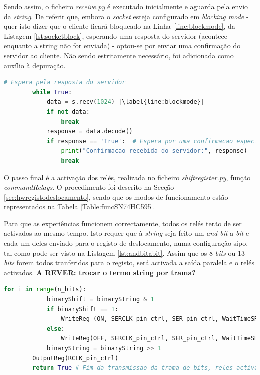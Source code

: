 Sendo assim, o ficheiro \textit{receive.py} é executado inicialmente e aguarda pela envio da \textit{string}. De referir que, embora o \textit{socket} esteja configurado em \textit{blocking mode} - quer isto dizer que o cliente ficará bloqueado na Linha~\ref{line:blockmode}, da Listagem \ref{lst:socketblock}, esperando uma resposta do servidor \cite{Sockets} (acontece enquanto a string não for enviada) - optou-se por enviar uma confirmação do servidor ao cliente. Não sendo estritamente necessário, foi adicionada como auxílio à depuração.

\begin{minipage}{0.9\linewidth}
	\begin{lstlisting}[language=Python,escapechar=|, caption=\textit{Block Mode \textins{Sockets} configRelays.py}, label=lst:socketblock]
		# Espera pela resposta do servidor
        while True:
            data = s.recv(1024) |\label{line:blockmode}|
            if not data:
                break
            response = data.decode()
            if response == 'True':  # Espera por uma confirmacao especifica do servidor
                print("Confirmacao recebida do servidor:", response)
                break
	\end{lstlisting}
\end{minipage}

O passo final é a activação dos relés, realizada no ficheiro \textit{shift\textunderscore register.py}, função \textit{commandRelays}. O procedimento foi descrito na Secção \ref{sec:hwregistodeslocamento}, sendo que os modos de funcionamento estão representados na Tabela \ref{Table:funcSN74HC595}.

Para que as experiências funcionem correctamente, todos os relés terão de ser activados ao mesmo tempo. Isto requer que à \textit{string} seja feito um \textit{and bit} a \textit{bit} e cada um deles enviado para o registo de deslocamento, numa configuração \acrshort{sipo}, tal como pode ser visto na Listagem \ref{lst:andbitabit}. Assim que os 8 \textit{bits} ou 13 \textit{bits} forem todos tranferidos para o registo, será activada a saída paralela e o relés activados. \textbf{A REVER: trocar o termo string por trama?} 

\begin{minipage}{0.9\linewidth}
	\begin{lstlisting}[language=Python,escapechar=|, caption=\textit{And bit} \textit{bit shift\textunderscore register - NOME DO FICH}, label=lst:andbitabit]
		for i in range(n_bits):
			binaryShift = binaryString & 1
			if binaryShift == 1:
				WriteReg (ON, SERCLK_pin_ctrl, SER_pin_ctrl, WaitTimeSR)
			else:
				WriteReg(OFF, SERCLK_pin_ctrl, SER_pin_ctrl, WaitTimeSR)
			binaryString = binaryString >> 1
		OutputReg(RCLK_pin_ctrl)
		return True # Fim da transmissao da trama de bits, reles activados
	\end{lstlisting}
\end{minipage}

